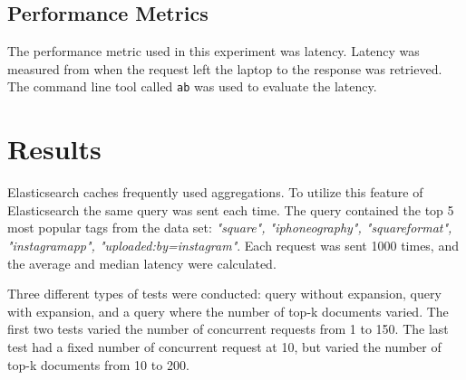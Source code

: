 \subsection{Performance Metrics}
The performance metric used in this experiment was latency.
Latency was measured from when the request left the laptop to the response was retrieved.
The command line tool called \texttt{ab} \cite{apache-benchmark} was used to evaluate the latency.




\section{Results}
\label{sec:results}
Elasticsearch caches frequently used aggregations.
To utilize this feature of Elasticsearch the same query was sent each time.
The query contained the top 5 most popular tags from the data set: \textit{"square", "iphoneography", "squareformat", "instagramapp", "uploaded:by=instagram"}.
Each request was sent 1000 times, and the average and median latency were calculated.

Three different types of tests were conducted: query without expansion, query with expansion, and a query where the number of top-k documents varied.
The first two tests varied the number of concurrent requests from 1 to 150.
The last test had a fixed number of concurrent request at 10,
but varied the number of top-k documents from 10 to 200.


